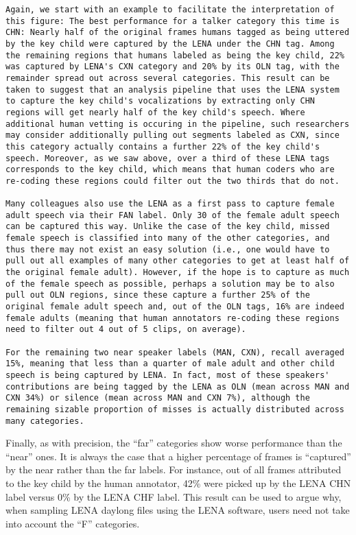 \documentclass[english,floatsintext,man]{apa6}
\begin{document}
\begin{verbatim}
Again, we start with an example to facilitate the interpretation of this figure: The best performance for a talker category this time is CHN: Nearly half of the original frames humans tagged as being uttered by the key child were captured by the LENA under the CHN tag. Among the remaining regions that humans labeled as being the key child, 22% was captured by LENA's CXN category and 20% by its OLN tag, with the remainder spread out across several categories. This result can be taken to suggest that an analysis pipeline that uses the LENA system to capture the key child's vocalizations by extracting only CHN regions will get nearly half of the key child's speech. Where additional human vetting is occuring in the pipeline, such researchers may consider additionally pulling out segments labeled as CXN, since this category actually contains a further 22% of the key child's speech. Moreover, as we saw above, over a third of these LENA tags corresponds to the key child, which means that human coders who are re-coding these regions could filter out the two thirds that do not.

Many colleagues also use the LENA as a first pass to capture female adult speech via their FAN label. Only 30 of the female adult speech can be captured this way. Unlike the case of the key child, missed female speech is classified into many of the other categories, and thus there may not exist an easy solution (i.e., one would have to pull out all examples of many other categories to get at least half of the original female adult). However, if the hope is to capture as much of the female speech as possible, perhaps a solution may be to also pull out OLN regions, since these capture a further 25% of the original female adult speech and, out of the OLN tags, 16% are indeed female adults (meaning that human annotators re-coding these regions need to filter out 4 out of 5 clips, on average).

For the remaining two near speaker labels (MAN, CXN), recall averaged 15%, meaning that less than a quarter of male adult and other child speech is being captured by LENA. In fact, most of these speakers' contributions are being tagged by the LENA as OLN (mean across MAN and CXN 34%) or silence (mean across MAN and CXN 7%), although the remaining sizable proportion of misses is actually distributed across many categories. 
\end{verbatim}

Finally, as with precision, the \enquote{far} categories show worse
performance than the \enquote{near} ones. It is always the case that a
higher percentage of frames is \enquote{captured} by the near rather
than the far labels. For instance, out of all frames attributed to the
key child by the human annotator, 42\% were picked up by the LENA CHN
label versus 0\% by the LENA CHF label. This result can be used to argue
why, when sampling LENA daylong files using the LENA software, users
need not take into account the \enquote{F} categories.
\end{document}
